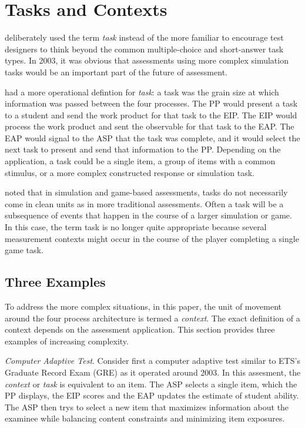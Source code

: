 \documentclass{article}
\begin{document}
  \section{Tasks and Contexts}
  \label{sec:context}

   deliberately used the term \textit{task}
  instead of the more familiar  to encourage test
  designers to think beyond the common multiple-choice and
  short-answer task types. In 2003, it was obvious that assessments
  using more complex simulation tasks would be an important part of
  the future of assessment.

   had a more operational defintion for \textit{task}:  a
  task was the grain size at which information was passed between the
  four processes.  The PP would present a task to a student and
  send the work product for that task to the EIP.  The EIP would
  process the work product and sent the observable for that task to
  the EAP.  The EAP would signal to the ASP that the task was
  complete, and it would select the next task to present and send that
  information to the PP.  Depending on the application, a task could
  be a single item, a group of items with a common stimulus, or a more
  complex constructed response or simulation task.

   noted that in simulation and game-based assessments,
  tasks do not necessarily come in clean units as in more traditional
  assessments.  Often a task will be a subsequence of events that
  happen in the course of a larger simulation or game.  In this case,
  the term task is no longer quite appropriate because several
  measurement contexts might occur in the course of the player
  completing a single game task.
  
  \subsection{Three Examples}

  To address the more complex situations, in this paper, the unit of
  movement around the four process architecture is termed a
  \textit{context}.  The exact definition of a context depends on the
  assessment application.  This section provides three examples of
  increasing complexity.

  \noindent\textit{Computer Adaptive Test}.  Consider first a computer
  adaptive test similar to ETS's Graduate Record Exam (GRE{\registered}) as
  it operated around 2003.  In this assesment, the \textit{context} or
  \textit{task} is equivalent to an item.  The ASP selects a single
  item, which the PP displays, the EIP scores and the EAP updates the
  estimate of student ability.  The ASP then trys to select a new item
  that maximizes information about the examinee while balancing
  content constraints and minimizing item exposures.
\end{document}
